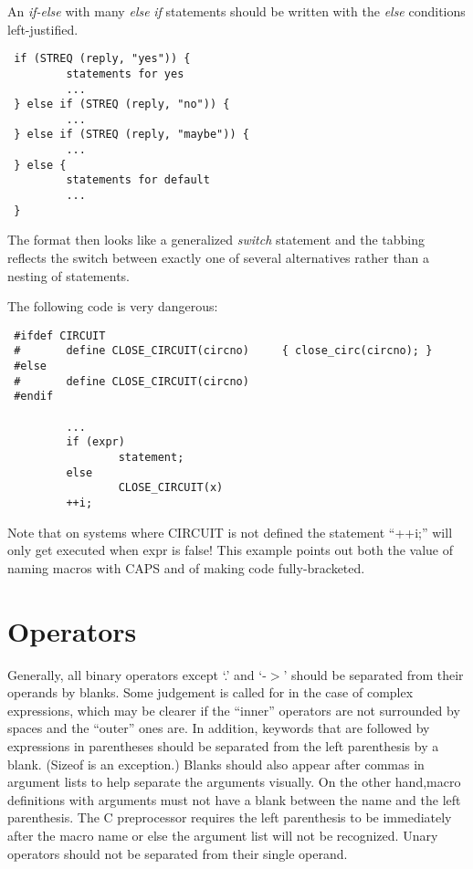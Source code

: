 An {\em if-else} with many {\em else} {\em if} statements should be
written with the {\em else} conditions left-justified.

\begin{verbatim}
 if (STREQ (reply, "yes")) {
         statements for yes
         ...
 } else if (STREQ (reply, "no")) {
         ...
 } else if (STREQ (reply, "maybe")) {
         ...
 } else {  
         statements for default
         ...
 } 
\end{verbatim}

The format then looks like a generalized {\em switch} statement and the
tabbing reflects the switch between exactly one of several alternatives
rather than a nesting of statements. 

The following code is very dangerous: 

\begin{verbatim}
 #ifdef CIRCUIT
 #       define CLOSE_CIRCUIT(circno)     { close_circ(circno); }
 #else
 #       define CLOSE_CIRCUIT(circno)
 #endif

         ...
         if (expr)
                 statement;
         else
                 CLOSE_CIRCUIT(x)
         ++i;
\end{verbatim}

Note that on systems where CIRCUIT is not defined the statement ``++i;'' will
only get executed when expr is false! This example points out both the value
of naming macros with CAPS and of making code fully-bracketed. 

\section{Operators}

 Generally, all binary operators except `.' and `-$>$' should be
separated from their operands by blanks. Some judgement is called
for in the case of complex expressions, which may be clearer if the
``inner'' operators are not surrounded by spaces and the ``outer''
ones are. In addition, keywords that are followed by expressions in
parentheses should be separated from the left parenthesis by a blank.
(Sizeof is an exception.) Blanks should also appear after commas in
argument lists to help separate the arguments visually. On the other
hand,macro definitions with arguments must not have a blank between
the name and the left parenthesis. The C preprocessor requires the
left parenthesis to be immediately after the macro name or else the
argument list will not be recognized. Unary operators should not be
separated from their single operand. 

